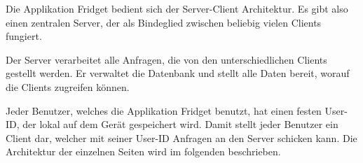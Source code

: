 Die Applikation Fridget bedient sich der Server-Client Architektur. Es gibt also einen zentralen Server, der als Bindeglied zwischen beliebig vielen Clients fungiert.

Der Server verarbeitet alle Anfragen, die von den unterschiedlichen Clients gestellt werden. Er verwaltet die Datenbank und stellt alle Daten bereit, worauf die Clients zugreifen können.

Jeder Benutzer, welches die Applikation Fridget benutzt, hat einen festen User-ID, der lokal auf dem Gerät gespeichert wird. Damit stellt jeder Benutzer ein Client dar, welcher mit seiner User-ID Anfragen an den Server schicken kann. 
Die Architektur der einzelnen Seiten wird im folgenden beschrieben.  

